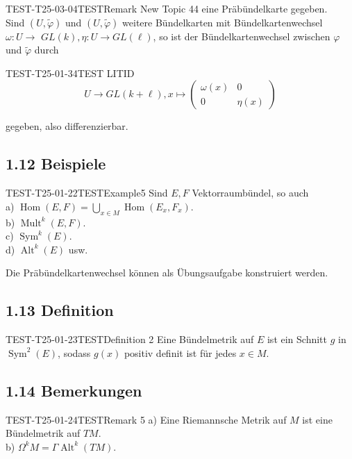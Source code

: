 \begin{KORO}{TEST-T25-03-04}{TESTRemark New Topic 44}
eine Präbündelkarte gegeben.\\
Sind $(U, \tilde{\varphi})$ und $(U, \tilde{\varphi})$ weitere Bündelkarten mit Bündelkartenwechsel $\omega: U \rightarrow$ $G L(k), \eta: U \rightarrow G L(\ell)$, so ist der Bündelkartenwechsel zwischen $\varphi$ und $\tilde{\varphi}$ durch
\end{KORO}

\begin{EXA}{TEST-T25-01-34}{TEST LITID}
$$
U \rightarrow G L(k+\ell), x \mapsto\left(\begin{array}{cc}
\omega(x) & 0 \\
0 & \eta(x)
\end{array}\right)
$$
\end{EXA}

gegeben, also differenzierbar.


\subsection*{1.12 Beispiele}
\begin{EXA}{TEST-T25-01-22}{TESTExample5}
Sind $E, F$ Vektorraumbündel, so auch\\
a) $\operatorname{Hom}(E, F)=\bigcup_{x \in M} \operatorname{Hom}\left(E_{x}, F_{x}\right)$.\\
b) $\operatorname{Mult}^{k}(E, F)$.\\
c) $\operatorname{Sym}^{k}(E)$.\\
d) $\operatorname{Alt}^{k}(E)$ usw.

Die Präbündelkartenwechsel können als Übungsaufgabe konstruiert werden.
\end{EXA}

\subsection*{1.13 Definition}
\begin{DEF}{TEST-T25-01-23}{TESTDefinition 2}
Eine Bündelmetrik auf $E$ ist ein Schnitt $g$ in $\operatorname{Sym}^{2}(E)$, sodass $g(x)$ positiv definit ist für jedes $x \in M$.
\end{DEF}

\subsection*{1.14 Bemerkungen}
\begin{REM}{TEST-T25-01-24}{TESTRemark 5}
a) Eine Riemannsche Metrik auf $M$ ist eine Bündelmetrik auf $T M$.\\
b) $\Omega^{k} M=\Gamma \operatorname{Alt}^{k}(T M)$.
\end{REM}

